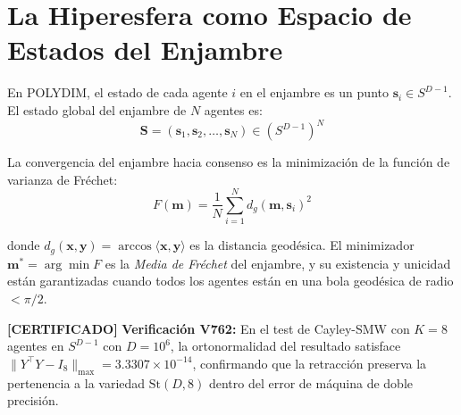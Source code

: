 \section{La Hiperesfera como Espacio de Estados del Enjambre}

En POLYDIM, el estado de cada agente $i$ en el enjambre es un punto
$\mathbf{s}_i \in S^{D-1}$. El estado global del enjambre de $N$ agentes es:
\begin{equation}
\mathbf{S} = (\mathbf{s}_1, \mathbf{s}_2, \ldots, \mathbf{s}_N) \in (S^{D-1})^N
\end{equation}

La convergencia del enjambre hacia consenso es la minimización de la función
de varianza de Fréchet:
\begin{equation}
F(\mathbf{m}) = \frac{1}{N} \sum_{i=1}^{N} d_g(\mathbf{m}, \mathbf{s}_i)^2
\end{equation}

donde $d_g(\mathbf{x}, \mathbf{y}) = \arccos\langle \mathbf{x}, \mathbf{y} \rangle$
es la distancia geodésica. El minimizador $\mathbf{m}^* = \arg\min F$ es la
\textit{Media de Fréchet} del enjambre, y su existencia y unicidad están garantizadas
cuando todos los agentes están en una bola geodésica de radio $< \pi/2$.

\textbf{[CERTIFICADO]} 
\textbf{Verificación V762:} En el test de Cayley-SMW con $K = 8$ agentes en
$S^{D-1}$ con $D = 10^6$, la ortonormalidad del resultado satisface
$\|{Y^\top Y - I_8}\|_{\max} = 3.3307 \times 10^{-14}$, confirmando que
la retracción preserva la pertenencia a la variedad $\text{St}(D, 8)$
dentro del error de máquina de doble precisión.

